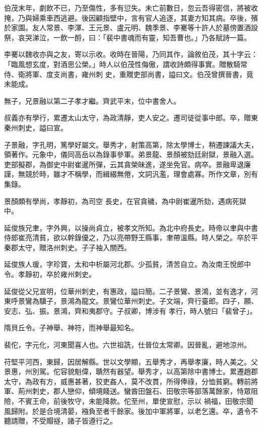 \begin{pinyinscope}
 伯茂末年，劇飲不已，乃至傷性，多有愆失。未亡前數日，忽云吾得密信，將被收掩，乃與婦乘車西逃避。後因顧指壁中，言有官人追逐，其妻方知其病。卒後，殯於家園。友人常景、李渾、王元景、盧元明、魏季景、李騫等十許人於墓傍置酒設祭，哀哭涕泣，一飲一酹，曰：「裴中書魂而有靈，知吾曹也。」乃各賦詩一篇。



 李騫以魏收亦與之友，寄以示收。收時在晉陽，乃同其作，論敘伯茂，其十字云：「臨風想玄度，對酒思公榮。」時人以伯茂性侮傲，謂收詩頗得事實。贈散騎常侍、衛將軍、度支尚書，雍州刺
 史，重贈吏部尚書，謚曰文。伯茂曾撰晉書，竟未能成。



 無子，兄景融以第二子孝才繼。齊武平末，位中書舍人。



 叔義亦有學行，累遷太山太守，為政清靜，吏人安之。遷司徒從事中郎。卒，贈東秦州刺史，謚曰宣。



 子景融，字孔明，篤學好屬文。舉秀才，射策高第，除太學博士，稍遷諫議大夫，領著作。元象中，儀同高岳以為錄事參軍。弟景龍、景顏被劾廷尉獄，景融入選。吏部擬郡，為御史中尉崔暹所彈，云其貪榮昧進，遂坐免官。病卒。景融卑退廉謹，無競於時，雖才不稱學，而緝綴無倦，文詞汎濫，理會處寡。所作文章，別有集錄。



 景顏頗有學尚，孝靜初，為司空
 長史，在官貪穢，為中尉崔暹所劾，遇病死獄中。



 延俊族兄聿，字外興，以操尚貞立，被孝文所知。為北中府長史。時帝以聿與中書侍郎崔亮清貧，欲以幹錄優之，乃以亮帶野王縣事，聿帶溫縣。時人榮之。卒於平秦郡太守，贈洛州刺史。子子袖入關西。



 延俊族人瑗，字珍寶，太和中析屬河北郡。少孤貧，清苦自立。為汝南王悅郎中令。孝靜初，卒於雍州刺史。



 延俊從父兄宣明，位華州刺史，有惠政，謚曰簡。二子景鸞、景鴻，並有逸才，河東呼景鸞為驥子，景鴻為龍文。景鸞位華州刺史。子文端，齊行臺郎。四子，願、安志、弘、振。景鴻，齊和夷郡守。子叔卿，博涉有
 孝行，時人號曰「裴曾子」。



 隋貝丘令。子神舉、神符，而神舉最知名。



 裴佗，字元化，河東聞喜人也。六世祖詵，仕晉位太常卿。因晉亂，避地涼州。



 苻堅平河西，東歸，因居解縣。世以文學顯，五舉秀才，再舉孝廉，時人美之。父景惠，州別駕。佗容貌魁偉，聵然有器望。舉秀才，以高第除中書博士。累遷趙郡太守，為政有方，威惠甚著，狡吏姦人，莫不改貫，所得俸祿，分恤貧窮。轉前將軍、荊州刺史，郡人戀仰，傾境餞送。蠻酋田盤石、田敬宗等部落萬餘家，恃眾阻險，不賓王命，前後牧守，未能降款。佗至州，單使宣慰，示以
 禍福，田敬宗聞風歸附。於是合境清晏，襁負至者千餘家。後加中軍將軍，以老乞還。卒，遺令不聽請贈，不受賵襚，諸子皆遵行之。




\end{pinyinscope}
